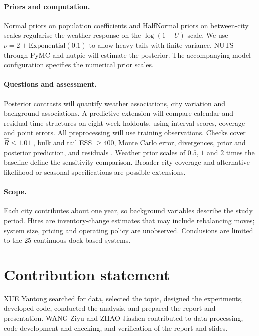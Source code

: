 \documentclass{article}
\begin{document}
\paragraph{Priors and computation.} Normal priors on population coefficients and
HalfNormal priors on between-city scales regularise the weather response on the
$\log(1+U)$ scale. We use $\nu=2+\text{Exponential}(0.1)$ to allow heavy tails with
finite variance. NUTS through PyMC \citep{abrilpla2023pymc} and nutpie
\citep{nutpie} will estimate the posterior. The accompanying model configuration
specifies the numerical prior scales.

\paragraph{Questions and assessment.} Posterior contrasts will quantify weather
associations, city variation and background associations. A predictive extension
will compare calendar and residual time
structures on eight-week holdouts, using interval scores, coverage and point
errors. All preprocessing will use training observations. Checks cover
$\widehat{R}\le1.01$ \citep{vehtari2021rank}, bulk and tail ESS $\ge400$, Monte
Carlo error, divergences, prior and posterior prediction, and residuals
\citep{gabry2019visualization}. Weather prior scales of $0.5$, $1$ and $2$ times
the baseline define the sensitivity comparison. Broader city coverage and
alternative likelihood or seasonal specifications are possible extensions.

\paragraph{Scope.} Each city contributes about one year, so background variables
describe the study period. Hires are inventory-change estimates that may include
rebalancing moves; system size, pricing and operating policy are unobserved.
Conclusions are limited to the 25 continuous dock-based systems.

\section*{Contribution statement}

XUE Yantong searched for data, selected the topic, designed the experiments, developed code,
conducted the analysis, and prepared the report and presentation. WANG Ziyu and ZHAO Jiashen
contributed to data processing, code development and
checking, and verification of the report and slides.

\small


\end{document}
